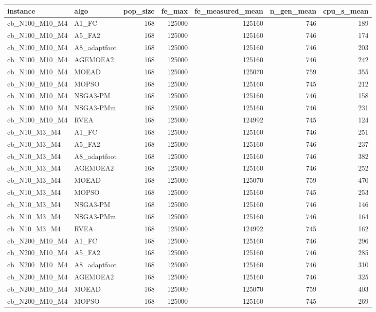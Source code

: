 \begin{tabular}{llrrrrr}
\toprule
instance & algo & pop_size & fe_max & fe_measured_mean & n_gen_mean & cpu_s_mean \\
\midrule
cb_N100_M10_M4 & A1_FC & 168 & 125000 & 125160 & 746 & 189 \\
cb_N100_M10_M4 & A5_FA2 & 168 & 125000 & 125160 & 746 & 174 \\
cb_N100_M10_M4 & A8_adaptfoot & 168 & 125000 & 125160 & 746 & 203 \\
cb_N100_M10_M4 & AGEMOEA2 & 168 & 125000 & 125160 & 746 & 242 \\
cb_N100_M10_M4 & MOEAD & 168 & 125000 & 125070 & 759 & 355 \\
cb_N100_M10_M4 & MOPSO & 168 & 125000 & 125160 & 745 & 212 \\
cb_N100_M10_M4 & NSGA3-PM & 168 & 125000 & 125160 & 746 & 158 \\
cb_N100_M10_M4 & NSGA3-PMm & 168 & 125000 & 125160 & 746 & 231 \\
cb_N100_M10_M4 & RVEA & 168 & 125000 & 124992 & 745 & 124 \\
cb_N10_M3_M4 & A1_FC & 168 & 125000 & 125160 & 746 & 251 \\
cb_N10_M3_M4 & A5_FA2 & 168 & 125000 & 125160 & 746 & 237 \\
cb_N10_M3_M4 & A8_adaptfoot & 168 & 125000 & 125160 & 746 & 382 \\
cb_N10_M3_M4 & AGEMOEA2 & 168 & 125000 & 125160 & 746 & 252 \\
cb_N10_M3_M4 & MOEAD & 168 & 125000 & 125070 & 759 & 470 \\
cb_N10_M3_M4 & MOPSO & 168 & 125000 & 125160 & 745 & 253 \\
cb_N10_M3_M4 & NSGA3-PM & 168 & 125000 & 125160 & 746 & 146 \\
cb_N10_M3_M4 & NSGA3-PMm & 168 & 125000 & 125160 & 746 & 164 \\
cb_N10_M3_M4 & RVEA & 168 & 125000 & 124992 & 745 & 162 \\
cb_N200_M10_M4 & A1_FC & 168 & 125000 & 125160 & 746 & 296 \\
cb_N200_M10_M4 & A5_FA2 & 168 & 125000 & 125160 & 746 & 285 \\
cb_N200_M10_M4 & A8_adaptfoot & 168 & 125000 & 125160 & 746 & 310 \\
cb_N200_M10_M4 & AGEMOEA2 & 168 & 125000 & 125160 & 746 & 325 \\
cb_N200_M10_M4 & MOEAD & 168 & 125000 & 125070 & 759 & 403 \\
cb_N200_M10_M4 & MOPSO & 168 & 125000 & 125160 & 745 & 269 \\

\end{tabular}
